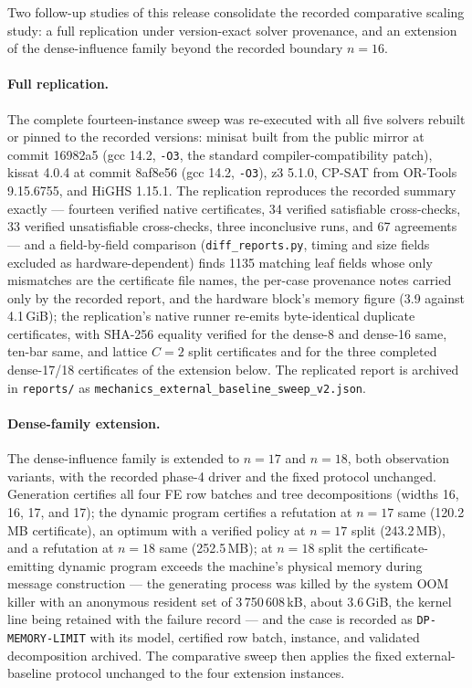 \documentclass[11pt]{article}
\theoremstyle{plain}
\theoremstyle{definition}
\theoremstyle{remark}
\begin{document}
Two follow-up studies of this release consolidate the recorded comparative
scaling study: a full replication under version-exact solver provenance,
and an extension of the dense-influence family beyond the recorded boundary
\(n{=}16\).

\paragraph{Full replication.}
The complete fourteen-instance sweep was re-executed with all five solvers
rebuilt or pinned to the recorded versions: minisat built from the public
mirror at commit 16982a5 (gcc 14.2, \texttt{-O3}, the standard
compiler-compatibility patch), kissat 4.0.4 at commit 8af8e56 (gcc 14.2,
\texttt{-O3}), z3 5.1.0, CP-SAT from OR-Tools 9.15.6755, and HiGHS 1.15.1.
The replication reproduces the recorded summary exactly --- fourteen
verified native certificates, 34 verified satisfiable cross-checks, 33
verified unsatisfiable cross-checks, three inconclusive runs, and 67
agreements --- and a field-by-field comparison
(\texttt{diff\_reports.py}, timing and size fields excluded as
hardware-dependent) finds 1135 matching leaf fields whose only mismatches are
the certificate file names, the per-case provenance notes carried only by the
recorded report, and the hardware block's memory figure (3.9 against
4.1\,GiB); the replication's native runner re-emits byte-identical duplicate
certificates, with SHA-256 equality verified for the dense-8 and dense-16
same, ten-bar same, and lattice \(C{=}2\) split certificates and for the
three completed dense-17/18 certificates of the extension below.
The replicated report is archived in \texttt{reports/} as
\texttt{mechanics\_external\_baseline\_sweep\_v2.json}.

\paragraph{Dense-family extension.}
The dense-influence family is extended to \(n{=}17\) and \(n{=}18\), both
observation variants, with the recorded phase-4 driver and the fixed
protocol unchanged.  Generation certifies all four FE row batches and
tree decompositions (widths 16, 16, 17, and 17); the dynamic program
certifies a refutation at \(n{=}17\) same (120.2\,MB certificate), an
optimum with a verified policy at \(n{=}17\) split (243.2\,MB), and a
refutation at \(n{=}18\) same (252.5\,MB); at \(n{=}18\) split the
certificate-emitting dynamic program exceeds the machine's physical memory
during message construction --- the generating process was killed by the
system OOM killer with an anonymous resident set of 3\,750\,608\,kB, about
3.6\,GiB, the kernel line being retained with the failure record --- and the
case is recorded
as \texttt{DP-MEMORY-LIMIT} with its model, certified row batch, instance,
and validated decomposition archived.  The comparative sweep then applies
the fixed external-baseline protocol unchanged to the four extension
instances.
\end{document}
